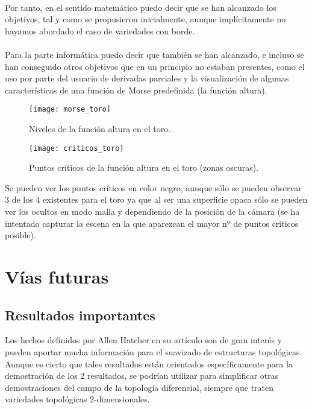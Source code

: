 \\Por tanto, en el sentido matemático puedo decir que se han alcanzado los objetivos, tal y como se propusieron inicialmente, aunque implícitamente no hayamos abordado el caso de variedades con borde.\\
\\Para la parte informática puedo decir que también se han alcanzado, e incluso se han conseguido otros objetivos que en un principio no estaban presentes, como el uso por parte del usuario de derivadas parciales y la visualización de algunas características de una función de Morse predefinida (la función altura).\\

\newpage
\begin{figure}[h]
	\begin{minipage}{0.48\textwidth}
		\centering
		\texttt{[image: morse\_toro]}
		\caption{Niveles de la función altura en el toro.}
	\end{minipage}\hfill
	\begin{minipage}{0.48\textwidth}
		\centering
		\texttt{[image: criticos\_toro]}
		\caption{Puntos críticos de la función altura en el toro (zonas oscuras).}
	\end{minipage}
 		\label{fig:morse_toro}
\end{figure}	

Se pueden ver los puntos críticos en color negro, aunque sólo se pueden observar $3$ de los $4$ existentes para el toro ya que al ser una superficie opaca sólo se pueden ver los ocultos en modo malla y dependiendo de la posición de la cámara (se ha intentado capturar la escena en la que aparezcan el mayor nº de puntos críticos posible).

\section*{Vías futuras}

\subsection*{Resultados importantes}
Los hechos definidos por Allen Hatcher en su artículo son de gran interés y pueden aportar mucha información para el suavizado de estructuras topológicas. Aunque es cierto que tales resultados están orientados específicamente para la demostración de los $2$ resultados, se podrían utilizar para simplificar otras demostraciones del campo de la topología diferencial, siempre que traten variedades topológicas $2$-dimensionales.\\


